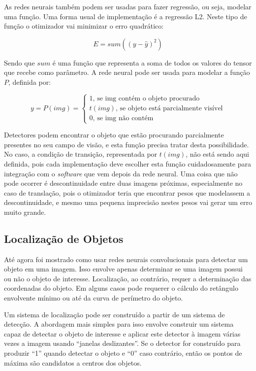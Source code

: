 As redes neurais também podem ser usadas para fazer regressão, ou seja, modelar
uma função. Uma forma usual de implementação é a regressão L2. Neste tipo de
função o otimizador vai minimizar o erro quadrático:

\begin{equation}
	E=sum \left( \left( y - \widehat{y} \right)^2 \right)
\end{equation}

Sendo que $sum$ é uma função que representa a soma de todos os valores do
tensor que recebe como parâmetro.
A rede neural pode ser usada para modelar a função $P$, definida por:

\begin{equation}
	y = P(img) = \begin{cases}
		1 \text{, se img contém o objeto procurado} \\
		t(img) \text{, se objeto está parcialmente visível} \\
		0 \text{, se img não contém}
	\end{cases}
\end{equation}

Detectores podem encontrar o objeto que estão procurando parcialmente presentes 
no seu campo de visão, e esta função precisa tratar desta possibilidade. No
caso, a condição de transição, representada por $t(img)$, não está sendo
aqui definida, pois cada implementação deve escolher esta função cuidadosamente
para integração com o \emph{software} que vem depois da rede neural.
Uma coisa que não pode ocorrer é descontinuidade entre duas imagens próximas,
especialmente no caso de translação, pois o otimizador teria que encontrar
pesos que modelassem a descontinuidade, e mesmo uma pequena imprecisão nestes
pesos vai gerar um erro muito grande.

\subsection{Localização de Objetos} \label{sec:localiz_objetos}
Até agora foi mostrado como usar redes neurais convolucionais para detectar um
objeto em uma imagem. Isso envolve apenas determinar se uma imagem possui ou não
o objeto de interesse. Localização, ao contrário, requer a determinação das
coordenadas do objeto. Em alguns casos pode requerer o cálculo do retângulo
envolvente mínimo ou até da curva de perímetro do objeto.

Um sistema de localização pode ser construído a partir de um sistema de
detecção. A abordagem mais simples para isso envolve construir um sistema capaz
de detectar o objeto de interesse e aplicar este
detector à imagem várias vezes a imagem usando ``janelas deslizantes''.
Se o detector for construído para produzir ``1'' quando detectar o objeto e
“0” caso contrário, então os pontos de máxima são candidatos a centros dos
objetos.

